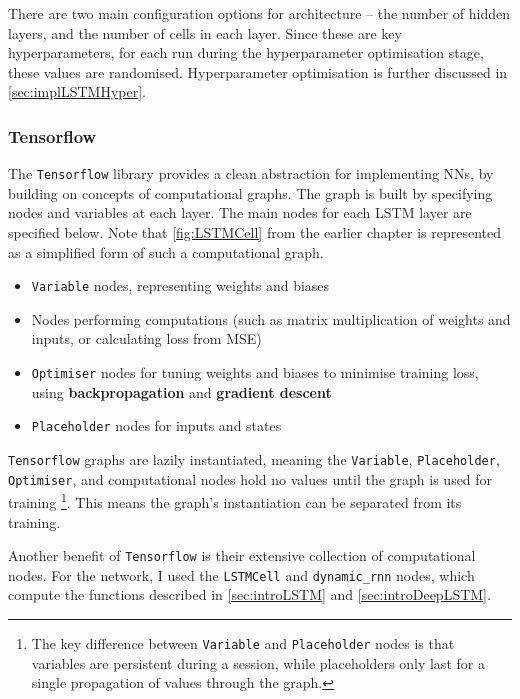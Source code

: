 \documentclass[12pt,a4paper,twoside,openright]{report}
\begin{document}
There are two main configuration options for architecture -- the number of hidden layers,
and the number of cells in each layer. Since these are key hyperparameters, for each run during
the hyperparameter optimisation stage, these values are
randomised. Hyperparameter optimisation is further discussed in \cref{sec:implLSTMHyper}.

\subsubsection{Tensorflow}
The \texttt{Tensorflow} library provides a clean abstraction for implementing
NNs, by building on concepts of computational graphs. The
graph is built by specifying nodes and variables at each layer. The main
nodes for each LSTM layer are specified below. Note that
\cref{fig:LSTMCell} from the earlier
chapter is represented as a simplified form of such a computational graph.

\begin{itemize}
\item
\texttt{Variable} nodes, representing weights and biases

\item
Nodes performing computations (such as matrix multiplication of weights and inputs,
or calculating loss from MSE)

\item
\texttt{Optimiser} nodes for tuning weights and biases to minimise training loss, using
\textbf{backpropagation} and \textbf{gradient descent}

\item
\texttt{Placeholder} nodes for inputs and states
\end{itemize}

\texttt{Tensorflow} graphs are lazily instantiated, meaning the \texttt{Variable}, \texttt{Placeholder},
\texttt{Optimiser}, and
computational nodes hold no values until the graph is used for training
\footnote{The key difference between \texttt{Variable} and \texttt{Placeholder}
nodes is that variables are persistent during a session, while placeholders only last for a single
propagation of values through the graph.}. This means the graph's
instantiation can be separated from its training.

Another benefit of \texttt{Tensorflow} is their extensive collection of computational
nodes. For the network, I used the \texttt{LSTMCell} and \texttt{dynamic\_rnn} nodes,
which compute the functions described in \cref{sec:introLSTM} and \cref{sec:introDeepLSTM}.
\end{document}
